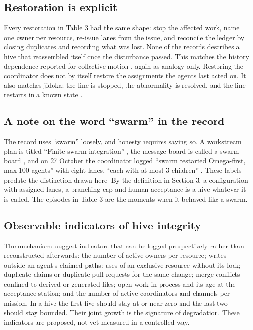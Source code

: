 \documentclass[11pt]{article}
\begin{document}
\subsection{Restoration is explicit}

Every restoration in Table 3 had the same shape: stop the affected work, name one owner per resource, re-issue lanes from the issue, and reconcile the ledger by closing duplicates and recording what was lost. None of the records describes a hive that reassembled itself once the disturbance passed. This matches the history dependence reported for collective motion \cite{couzin2002}, again as analogy only. Restoring the coordinator does not by itself restore the assignments the agents last acted on. It also matches jidoka: the line is stopped, the abnormality is resolved, and the line restarts in a known state \cite{toyota}.

\subsection{A note on the word ``swarm'' in the record}

The record uses ``swarm'' loosely, and honesty requires saying so. A workstream plan is titled ``Finite swarm integration'' \cite{workplan}, the message board is called a swarm board \cite{board}, and on 27 October the coordinator logged ``swarm restarted Omega-first, max 100 agents'' with eight lanes, ``each with at most 3 children'' \cite{oprecord}. These labels predate the distinction drawn here. By the definition in Section 3, a configuration with assigned lanes, a branching cap and human acceptance is a hive whatever it is called. The episodes in Table 3 are the moments when it behaved like a swarm.

\subsection{Observable indicators of hive integrity}

The mechanisms suggest indicators that can be logged prospectively rather than reconstructed afterwards: the number of active owners per resource; writes outside an agent's claimed paths; uses of an exclusive resource without its lock; duplicate claims or duplicate pull requests for the same change; merge conflicts confined to derived or generated files; open work in process and its age at the acceptance station; and the number of active coordinators and channels per mission. In a hive the first five should stay at or near zero and the last two should stay bounded. Their joint growth is the signature of degradation. These indicators are proposed, not yet measured in a controlled way.
\end{document}
